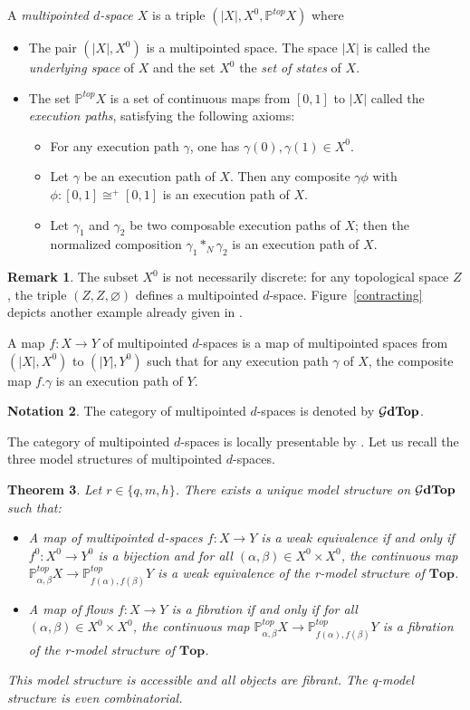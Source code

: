 \documentclass[a4paper,12pt]{amsart}
\newcommand{\p}{\times}
\renewcommand{\P}{\mathbb{P}}
\newtheorem{thm}{Theorem}[section]
\newcommand{\bth}{\begin{thm}}
\renewcommand{\eth}{\end{thm}}
\theoremstyle{definition}
\newtheorem{rem}[thm]{Remark}
\newtheorem{nota}[thm]{Notation}
\renewcommand{\top}{{\mathbf{Top}}}
\newcommand{\iso}{\cong}
\newcommand{\ptop}[1]{{\brm{{#1}dTop}}}
\newcommand{\brm}[1]{{\rm{\mathbf{#1}}}}
\renewcommand{\P}{\mathbb{P}}
\begin{document}
A \textit{multipointed $d$-space $X$} \cite{mdtop} is a triple $(|X|,X^0,\P^{top}X)$ where
\begin{itemize}[leftmargin=*]
	\item The pair $(|X|,X^0)$ is a multipointed space. The space $|X|$ is called the \textit{underlying space} of $X$ and the set $X^0$ the \textit{set of states} of $X$. 
	\item The set $\P^{top}X$ is a set of continuous maps from $[0,1]$ to $|X|$ called the \textit{execution paths}, satisfying the following axioms:
	\begin{itemize}
		\item For any execution path $\gamma$, one has $\gamma(0),\gamma(1)\in X^0$.
		\item Let $\gamma$ be an execution path of $X$. Then any composite $\gamma\phi$ with $\phi:[0,1]\iso^+ [0,1]$ is an execution path of $X$.
		\item Let $\gamma_1$ and $\gamma_2$ be two composable execution paths of $X$; then the normalized composition $\gamma_1 *_N \gamma_2$ is an execution path of $X$.
	\end{itemize}
\end{itemize}

\begin{rem}
	The subset $X^0$ is not necessarily discrete: for any topological space $Z$, the triple $(Z,Z,\varnothing)$ defines a multipointed $d$-space. Figure~\ref{contracting} depicts another example already given in \cite[Figure~1]{Moore2}.
\end{rem} 

A map $f:X\to Y$ of multipointed $d$-spaces is a map of multipointed spaces from $(|X|,X^0)$ to $(|Y|,Y^0)$ such that for any execution path $\gamma$ of $X$, the composite map $f. \gamma$ is an execution path of $Y$. 

\begin{nota}
	The category of multipointed $d$-spaces is denoted by $\ptop{\mathcal{G}}$. 
\end{nota}

The category of multipointed $d$-spaces is locally presentable by \cite[Theorem~3.5]{mdtop}.  Let us recall the three model structures of multipointed $d$-spaces.

\bth \label{three} \cite[Theorem~6.14]{QHMmodel} 
Let $r\in \{q,m,h\}$. There exists a unique model structure on $\ptop{\mathcal{G}}$ such that: 
\begin{itemize}[leftmargin=*]
	\item A map of multipointed $d$-spaces $f:X\to Y$ is a weak equivalence if and only if $f^0:X^0\to Y^0$ is a bijection and for all $(\alpha,\beta)\in X^0\p X^0$, the continuous map $\P^{top}_{\alpha,\beta}X\to \P^{top}_{f(\alpha),f(\beta)}Y$ is a weak equivalence of the r-model structure of $\top$.
	\item A map of flows $f:X\to Y$ is a fibration if and only if for all $(\alpha,\beta)\in X^0\p X^0$, the continuous map $\P^{top}_{\alpha,\beta}X\to \P^{top}_{f(\alpha),f(\beta)}Y$ is a fibration of the r-model structure of $\top$.
\end{itemize}
This model structure is accessible and all objects are fibrant. The q-model structure is even combinatorial.
\eth
\end{document}
